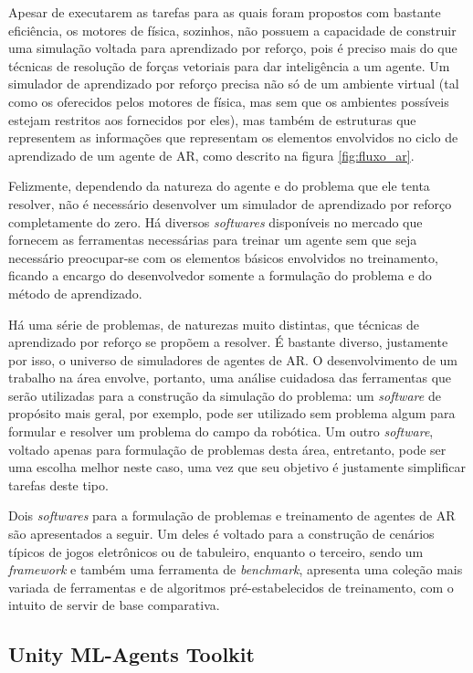 \documentclass[cic,tc]{iiufrgs}
\begin{document}
Apesar de executarem as tarefas para as quais foram propostos com bastante
eficiência, os motores de física, sozinhos, não possuem a capacidade de
construir uma simulação voltada para aprendizado por reforço, pois é preciso
mais do que técnicas de resolução de forças vetoriais para dar inteligência a um
agente. Um simulador de aprendizado por reforço precisa não só de um ambiente
virtual (tal como os oferecidos pelos motores de física, mas sem que os
ambientes possíveis estejam restritos aos fornecidos por eles), mas também de
estruturas que representem as informações que representam os elementos
envolvidos no ciclo de aprendizado de um agente de AR, como descrito na figura
\ref{fig:fluxo_ar}.


Felizmente, dependendo da natureza do agente e do problema que ele tenta
resolver, não é necessário desenvolver um simulador de aprendizado por reforço
completamente do zero. Há diversos \textit{softwares} disponíveis no mercado que
fornecem as ferramentas necessárias para treinar um agente sem que seja
necessário preocupar-se com os elementos básicos envolvidos no treinamento,
ficando a encargo do desenvolvedor somente a formulação do problema e do método
de aprendizado.


Há uma série de problemas, de naturezas muito distintas, que técnicas de
aprendizado por reforço se propõem a resolver. É bastante diverso, justamente
por isso, o universo de simuladores de agentes de AR. O desenvolvimento de um
trabalho na área envolve, portanto, uma análise cuidadosa das ferramentas que
serão utilizadas para a construção da simulação do problema: um
\textit{software} de propósito mais geral, por exemplo, pode ser utilizado sem
problema algum para formular e resolver um problema do campo da robótica. Um
outro \textit{software}, voltado apenas para formulação de problemas desta área,
entretanto, pode ser uma escolha melhor neste caso, uma vez que seu objetivo é
justamente simplificar tarefas deste tipo.


Dois \textit{softwares} para a formulação de problemas e treinamento de agentes
de AR são apresentados a seguir. Um deles é voltado para a construção de
cenários típicos de jogos eletrônicos ou de
tabuleiro, enquanto o terceiro, sendo um \textit{framework} e também uma
ferramenta de \textit{benchmark}, apresenta uma coleção mais variada de
ferramentas e de algoritmos pré-estabelecidos de treinamento, com o intuito de
servir de base comparativa.

\subsection{Unity ML-Agents Toolkit}
\end{document}

